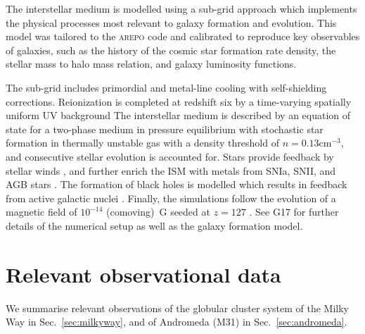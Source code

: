 \documentclass[a4paper,fleqn,usenatbib]{mnras}
\begin{document}
The interstellar medium is modelled using a sub-grid approach which implements
the physical processes most relevant to galaxy formation and evolution. 
This model was tailored to the \textsc{arepo} code and calibrated to reproduce
key observables of galaxies, such as the history of the cosmic star formation rate 
density, the stellar mass to halo mass relation, and galaxy luminosity functions.

The sub-grid includes primordial and metal-line cooling with self-shielding 
corrections. Reionization is completed at redshift six by a time-varying 
spatially uniform UV background \citep{2009ApJ...703.1416F, 2013MNRAS.436.3031V}
The interstellar medium is described by an equation of state for a two-phase medium
in pressure equilibrium \citep{2003MNRAS.339..289S} with stochastic star formation
in thermally unstable gas with a density threshold of $n = 0.13 \text{cm}^{-3}$,
and consecutive stellar evolution is accounted for. Stars provide feedback by 
stellar winds \citep{2014MNRAS.437.1750M, 2017MNRAS.467..179G}, and further 
enrich the ISM with metals from SNIa, SNII, and AGB stars \citep{2013MNRAS.436.3031V}.
The formation of black holes is modelled which results in feedback from active 
galactic nuclei \citep{2005MNRAS.361..776S, 2014MNRAS.437.1750M, 2017MNRAS.467..179G}.
Finally, the simulations follow the evolution of a magnetic field of $10^{-14}$
(comoving)~G seeded at $z = 127$ \citep{2013MNRAS.432..176P, 2014ApJ...783L..20P}.
See G17 for further details of the numerical setup as well as the galaxy formation
model.




\section{Relevant observational data}
\label{sec:observations}
We summarise relevant observations of the globular cluster system of the Milky 
Way in Sec.~\ref{sec:milkyway}, and of Andromeda (M31) in Sec.~\ref{sec:andromeda}.
\end{document}
